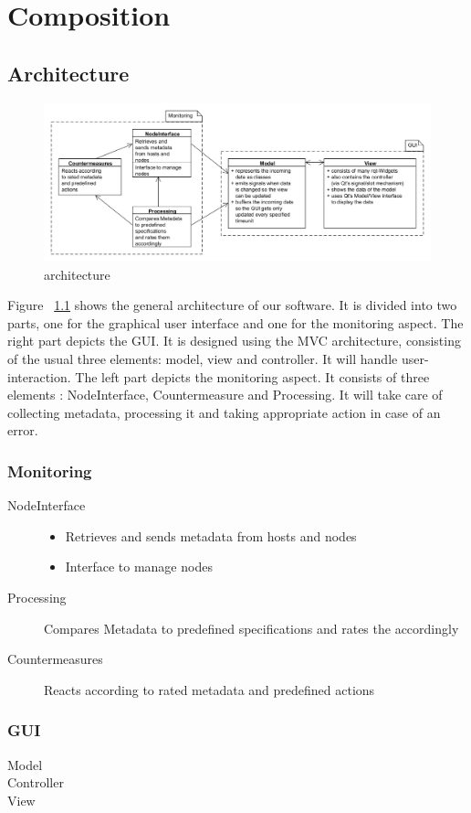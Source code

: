 \chapter{Composition}

\section{Architecture}

\begin{figure}[here]
\includegraphics[scale=0.5]{./bilder/architektur.png}
\caption{architecture}
\label{fig:architecture}
\end{figure}

Figure ~\ref{fig:architecture} shows the general architecture of our software. It is divided into two parts, one for the graphical user interface and one for the monitoring aspect.
The right part depicts the GUI. It is designed using the MVC architecture, consisting of the usual three elements: model, view and controller. It will handle user-interaction.
The left part depicts the monitoring aspect. It consists of three elements : NodeInterface, Countermeasure and Processing. It will take care of collecting metadata, processing it and taking appropriate action in case of an error.

\subsection{Monitoring}

\begin{description}
	\item[NodeInterface]
		\begin{itemize}
			\item Retrieves and sends metadata from hosts and nodes
			\item Interface to manage nodes
		\end{itemize}
	\item[Processing] Compares Metadata to predefined specifications and rates the accordingly
	\item[Countermeasures] Reacts according to rated metadata and predefined actions	
\end{description}

\subsection{GUI}

\begin{description}
	\item[Model]
	\item[Controller]
	\item[View]
\end{description}